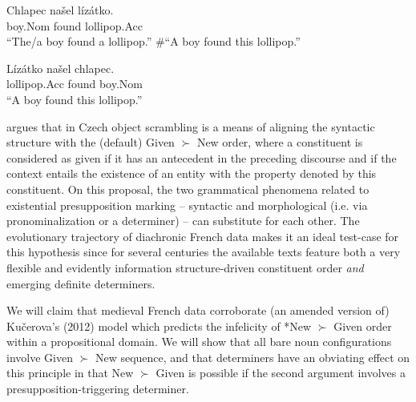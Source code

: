 \documentclass[output=paper,modfonts,nonflat]{langsci/langscibook}
\begin{document}
\ea\label{ex:czech1}
\gll Chlapec na\v{s}el l\'{i}z\'{a}tko.\\
boy.Nom found lollipop.Acc\\
\glt ``The/a boy found a lollipop.'' \#``A boy found this lollipop.'' 
\z

\ea\label{ex:czech2}
\gll L\'{i}z\'{a}tko na\v{s}el chlapec.\\
lollipop.Acc found boy.Nom \\
\glt ``A boy found this lollipop.''
\z



 
\citet{Kucerova:2012} argues that in Czech object scrambling is a means of aligning the syntactic structure with the (default) Given $\succ$ New order, where a constituent is considered as given if it has an antecedent in the preceding discourse and if the context entails the existence of an entity with the property denoted by this constituent. On this proposal, the two grammatical phenomena related to existential presupposition marking -- syntactic and morphological (i.e. via pronominalization or a determiner) -- can substitute for each other. The evolutionary trajectory of diachronic French data makes it an ideal test-case for this hypothesis since for several centuries the available texts feature both a very flexible and evidently information structure-driven constituent order {\it and} emerging definite determiners. 

We will claim that medieval French data corroborate (an amended version of) Ku\v{c}erova's (2012) model which predicts the infelicity of *New $\succ$ Given order within a propositional domain. We will show that all bare noun configurations involve Given $\succ$ New sequence, and that determiners have an obviating effect on this principle in that New $\succ$ Given is possible if the second argument involves a presupposition-triggering determiner. 
\end{document}
